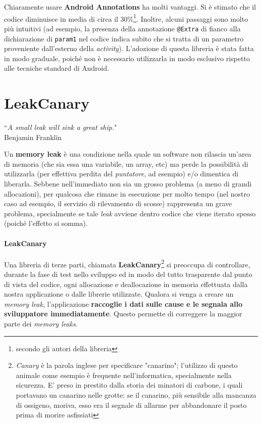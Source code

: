 \documentclass[a4paper,10pt]{memoir}
\begin{document}
Chiaramente usare \textbf{Android Annotations} ha molti vantaggi. Si è stimato che il codice diminuisce in media di circa il 30\%\footnote{secondo gli autori della libreria}. Inoltre, alcuni passaggi sono molto più intuitivi (ad esempio, la presenza della annotazione \texttt{@Extra} di fianco alla dichiarazione di \texttt{param1} nel codice indica subito che si tratta di un parametro proveniente dall'esterno della \textit{activity}). L'adozione di questa libreria è stata fatta in modo graduale, poiché non è necessario utilizzarla in modo esclusivo rispetto alle tecniche standard di Android.

\clearpage

\section{LeakCanary}

\begin{flushright}
``\textit{A small leak will sink a great ship.}" \\ Benjamin Franklin
\end{flushright}

\medskip

Un \textbf{memory leak} è una condizione nella quale un software non rilascia un'area di memoria (che sia essa una variabile, un array, etc) ma perde la possibilità di utilizzarla (per effettiva perdita del \textit{puntatore}, ad esempio) e/o dimentica di liberarla. Sebbene nell'immediato non sia un grosso problema (a meno di grandi allocazioni), per qualcosa che rimane in esecuzione per molto tempo (nel nostro caso ad esempio, il servizio di rilevamento di scosse) rappresenta un grave problema, specialmente se tale \textit{leak} avviene dentro codice che viene iterato spesso (poiché l'effetto si somma).

\paragraph{LeakCanary} Una libreria di terze parti, chiamata \textbf{LeakCanary}\footnote{\textit{Canary} è la parola inglese per specificare "canarino"; l'utilizzo di questo animale come esempio è frequente nell'informatica, specialmente nella sicurezza. E' preso in prestito dalla storia dei minatori di carbone, i quali portavano un canarino nelle grotte: se il canarino, più sensibile alla mancanza di ossigeno, moriva, esso era il segnale di allarme per abbandonare il posto prima di morire asfissiati} si preoccupa di controllare, durante la fase di test nello sviluppo ed in modo del tutto trasparente dal punto di vista del codice, ogni allocazione e deallocazione in memoria effettuata dalla nostra applicazione o dalle librerie utilizzate. Qualora si venga a creare un \textit{memory leak}, l'applicazione \textbf{raccoglie i dati sulle cause e le segnala allo sviluppatore immediatamente}. Questo permette di correggere la maggior parte dei \textit{memory leaks}.
\end{document}
